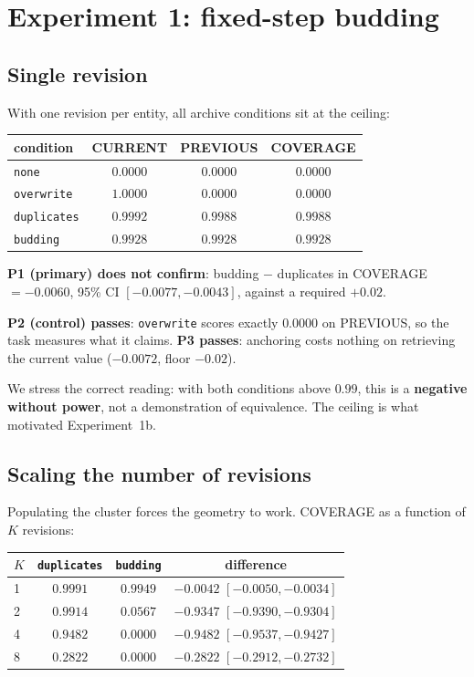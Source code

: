 \documentclass[11pt,a4paper]{article}
\begin{document}
\section{Experiment 1: fixed-step budding}
\label{sec:e1}

\subsection{Single revision}

With one revision per entity, all archive conditions sit at the ceiling:

\begin{center}
\begin{tabular}{lccc}
\toprule
condition & CURRENT & PREVIOUS & COVERAGE \\
\midrule
\texttt{none}       & $0.0000$ & $0.0000$ & $0.0000$ \\
\texttt{overwrite}  & $1.0000$ & $0.0000$ & $0.0000$ \\
\texttt{duplicates} & $0.9992$ & $0.9988$ & $0.9988$ \\
\texttt{budding}    & $0.9928$ & $0.9928$ & $0.9928$ \\
\bottomrule
\end{tabular}
\end{center}

\textbf{P1 (primary) does not confirm}: budding $-$ duplicates in COVERAGE $= -0.0060$,
95\% CI $[-0.0077, -0.0043]$, against a required $+0.02$.

\textbf{P2 (control) passes}: \texttt{overwrite} scores exactly $0.0000$ on PREVIOUS, so the task
measures what it claims. \textbf{P3 passes}: anchoring costs nothing on retrieving the current value
($-0.0072$, floor $-0.02$).

We stress the correct reading: with both conditions above $0.99$, this is a \textbf{negative without
power}, not a demonstration of equivalence. The ceiling is what motivated Experiment~1b.

\subsection{Scaling the number of revisions}

Populating the cluster forces the geometry to work. COVERAGE as a function of $K$ revisions:

\begin{center}
\begin{tabular}{lccc}
\toprule
$K$ & \texttt{duplicates} & \texttt{budding} & difference \\
\midrule
1 & $0.9991$ & $0.9949$ & $-0.0042$ $[-0.0050, -0.0034]$ \\
2 & $0.9914$ & $0.0567$ & $\mathbf{-0.9347}$ $[-0.9390, -0.9304]$ \\
4 & $0.9482$ & $0.0000$ & $\mathbf{-0.9482}$ $[-0.9537, -0.9427]$ \\
8 & $0.2822$ & $0.0000$ & $\mathbf{-0.2822}$ $[-0.2912, -0.2732]$ \\
\bottomrule
\end{tabular}
\end{center}
\end{document}
